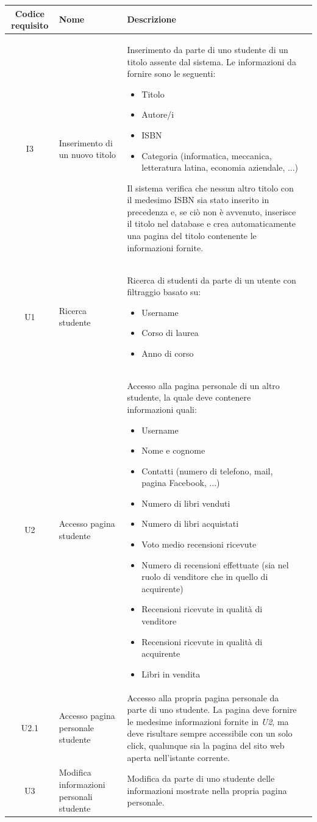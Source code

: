 \documentclass[10pt,a4paper]{article}
\begin{document}
	\begin{tabular}{cp{3cm}p{9cm}p{1cm}}
		Codice requisito&Nome&Descrizione\\ \hline
		I3&Inserimento di un nuovo titolo&Inserimento da parte di uno studente di un titolo assente dal sistema. Le informazioni da fornire sono le seguenti:
		\begin{itemize}
			\item Titolo
			\item Autore/i
			\item ISBN
			\item Categoria (informatica, meccanica, letteratura latina, economia aziendale, ...)
		\end{itemize}
		Il sistema verifica che nessun altro titolo con il medesimo ISBN sia stato inserito in precedenza e, se ciò non è avvenuto, inserisce il titolo nel database e crea automaticamente una pagina del titolo contenente le informazioni fornite.\\ \hline
		U1&Ricerca studente&Ricerca di studenti da parte di un utente con filtraggio basato su:
		\begin{itemize}
			\item Username
			\item Corso di laurea
			\item Anno di corso
		\end{itemize}\\ \hline
		U2&Accesso pagina studente&Accesso alla pagina personale di un altro studente, la quale deve contenere informazioni quali:
		\begin{itemize}
			\item Username
			\item Nome e cognome
			\item Contatti (numero di telefono, mail, pagina Facebook, ...)
			\item Numero di libri venduti
			\item Numero di libri acquistati
			\item Voto medio recensioni ricevute
			\item Numero di recensioni effettuate (sia nel ruolo di venditore che in quello di acquirente)
			\item Recensioni ricevute in qualità di venditore
			\item Recensioni ricevute in qualità di acquirente
			\item Libri in vendita
		\end{itemize}\\ \hline
		U2.1&Accesso pagina personale studente&Accesso alla propria pagina personale da parte di uno studente. La pagina deve fornire le medesime informazioni fornite in \textit{U2}, ma deve risultare sempre accessibile con un solo click, qualunque sia la pagina del sito web aperta nell'istante corrente.\\ \hline
		U3&Modifica informazioni personali studente&Modifica da parte di uno studente delle informazioni mostrate nella propria pagina personale.\\ \hline
	\end{tabular}
	\newpage
	
\end{document}
